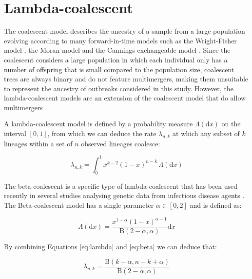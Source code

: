 \documentclass{article}
\renewcommand{\eqref}[1]{\ref{#1}}
\begin{document}
\section{Lambda-coalescent}

The coalescent model \citep{Kingman1982,Kingman1982a} describes the ancestry of a sample from a large population 
evolving according to many forward-in-time models such as the Wright-Fisher model \citep{Wright1931,Fisher1930}, 
the Moran model \citep{Moran1958} and the Cannings exchangeable model \citep{Cannings1974}.
Since the coalescent considers a large population in which each individual only has a number of offspring that is small
compared to the population size, coalescent trees are always binary and do not feature multimergers,
making them unsuitable to represent the ancestry of outbreaks considered in this study.
However, the lambda-coalescent models are an extension of the coalescent model that do
allow multimergers
\citep{pitmanCoalescentsMultipleCollisions1999,sagitovGeneralCoalescentAsynchronous1999,donnellyParticleRepresentationsMeasureValued1999}. 

A lambda-coalescent model is defined by a probability measure 
$\Lambda(\mathrm{d} x)$ on the interval $[0,1]$, from which we can deduce
the rate $\lambda_{n,k}$ at which any subset of $k$ lineages within a set of $n$ observed lineages 
coalesce:

\begin{equation}
    \lambda_{n,k} = \int_{0}^{1}{x^{k-2}(1-x)^{n-k}\,\Lambda(\mathrm{d} x)}\label{eq:lambda}
\end{equation}

The beta-coalescent \citep{schweinsbergCoalescentProcessesObtained2003} is a 
specific type of lambda-coalescent that has been used recently in several studies
analysing genetic data from infectious disease agents \citep{Hoscheit2019,Menardo2021,Helekal2024,zhangMultipleMergerCoalescent2024}.
The Beta-coalescent model 
has a single parameter $\alpha \in [0,2]$ and is defined as:

\begin{equation}
\Lambda(\mathrm{d}x)=\frac{x^{1-\alpha}(1-x)^{\alpha-1}}{\mathrm{B}(2-\alpha,\alpha)}\mathrm{d}x
\label{eq:beta}
\end{equation}

By combining Equations \eqref{eq:lambda} and \eqref{eq:beta} we can deduce that:

\begin{equation}
\lambda_{n,k}=\frac{\mathrm{B}(k-\alpha,n-k+\alpha)}{\mathrm{B}(2-\alpha,\alpha)}
\end{equation}
\end{document}
